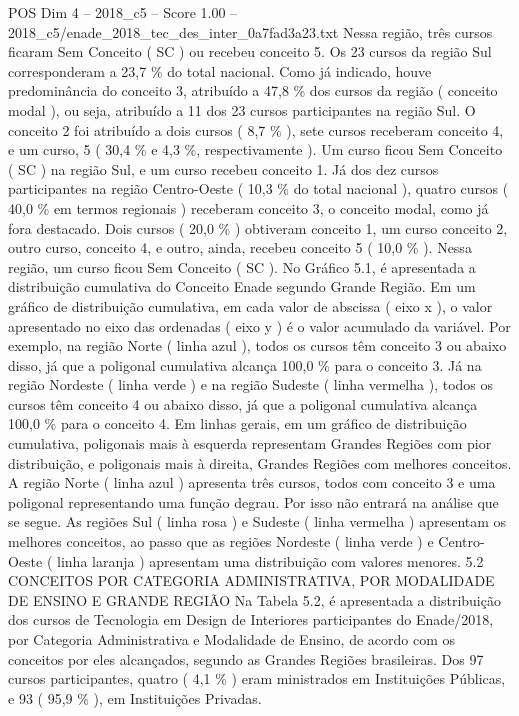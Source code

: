 \begin{textsample}{POS Dim 4 – 2018\_c5 – Score 1.00 – 2018\_c5/enade\_2018\_tec\_des\_inter\_0a7fad3a23.txt}
Nessa região, três cursos ficaram Sem Conceito ( SC ) ou recebeu conceito 5.
Os 23 cursos da região Sul corresponderam a 23,7 \% do total nacional.
Como já indicado, houve predominância do conceito 3, atribuído a 47,8 \% dos cursos da região ( conceito modal ), ou seja, atribuído a 11 dos 23 cursos participantes na região Sul.
O conceito 2 foi atribuído a dois cursos ( 8,7 \% ), sete cursos receberam conceito 4, e um curso, 5 ( 30,4 \% e 4,3 \%, respectivamente ).
Um curso ficou Sem Conceito ( SC ) na região Sul, e um curso recebeu conceito 1.
Já dos dez cursos participantes na região Centro-Oeste ( 10,3 \% do total nacional ), quatro cursos ( 40,0 \% em termos regionais ) receberam conceito 3, o conceito modal, como já fora destacado.
Dois cursos ( 20,0 \% ) obtiveram conceito 1, um curso conceito 2, outro curso, conceito 4, e outro, ainda, recebeu conceito 5 ( 10,0 \% ).
Nessa região, um curso ficou Sem Conceito ( SC ).
No Gráfico 5.1, é apresentada a distribuição cumulativa do Conceito Enade segundo Grande Região.
Em um gráfico de distribuição cumulativa, em cada valor de abscissa ( eixo x ), o valor apresentado no eixo das ordenadas ( eixo y ) é o valor acumulado da variável.
Por exemplo, na região Norte ( linha azul ), todos os cursos têm conceito 3 ou abaixo disso, já que a poligonal cumulativa alcança 100,0 \% para o conceito 3.
Já na região Nordeste ( linha verde ) e na região Sudeste ( linha vermelha ), todos os cursos têm conceito 4 ou abaixo disso, já que a poligonal cumulativa alcança 100,0 \% para o conceito 4.
Em linhas gerais, em um gráfico de distribuição cumulativa, poligonais mais à esquerda representam Grandes Regiões com pior distribuição, e poligonais mais à direita, Grandes Regiões com melhores conceitos.
A região Norte ( linha azul ) apresenta três cursos, todos com conceito 3 e uma poligonal representando uma função degrau.
Por isso não entrará na análise que se segue.
As regiões Sul ( linha rosa ) e Sudeste ( linha vermelha ) apresentam os melhores conceitos, ao passo que as regiões Nordeste ( linha verde ) e Centro-Oeste ( linha laranja ) apresentam uma distribuição com valores menores. 5.2 CONCEITOS POR CATEGORIA ADMINISTRATIVA, POR MODALIDADE DE ENSINO E GRANDE REGIÃO Na Tabela 5.2, é apresentada a distribuição dos cursos de Tecnologia em Design de Interiores participantes do Enade/2018, por Categoria Administrativa e Modalidade de Ensino, de acordo com os conceitos por eles alcançados, segundo as Grandes Regiões brasileiras.
Dos 97 cursos participantes, quatro ( 4,1 \% ) eram ministrados em Instituições Públicas, e 93 ( 95,9 \% ), em Instituições Privadas.

\end{textsample}
